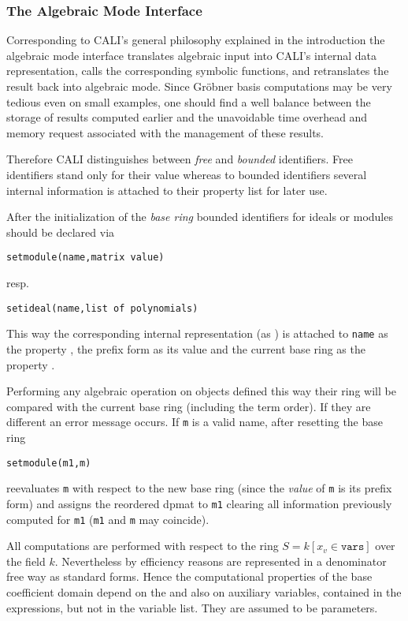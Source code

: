 \subsubsection{The Algebraic Mode Interface}

Corresponding to CALI's general philosophy explained in the
introduction the algebraic mode interface translates algebraic input
into CALI's internal data representation, calls the corresponding
symbolic functions, and retranslates the result back into algebraic
mode. Since Gr\"obner basis computations may be very tedious even on small
examples, one should find a well balance between the storage of
results computed earlier and the unavoidable time overhead and memory
request associated with the management of these results.

Therefore CALI distinguishes between \emph{free} and \emph{bounded}
 identifiers. Free
identifiers stand only for their value whereas to bounded identifiers
several internal information is attached to their property list for
later use.
\medskip

After the initialization of the \emph{base ring} bounded identifiers
for ideals or modules should be declared via
\begin{verbatim}
setmodule(name,matrix value)
\end{verbatim}
resp.
\begin{verbatim}
setideal(name,list of polynomials)
\end{verbatim}
This way the corresponding internal representation (as )
is attached to \texttt{name} as the property , the prefix
form as its value and the current base ring as the property
.

Performing any algebraic operation on objects defined this way their
ring will be compared with the current base ring (including the term
order). If they are different an error message occurs. If \texttt{m} is
a valid name, after resetting the base ring
\begin{verbatim}
setmodule(m1,m)
\end{verbatim}
reevaluates \texttt{m} with respect to the new base ring (since the
\emph{value} of \texttt{m} is its prefix form) and assigns the reordered
dpmat to \texttt{m1} clearing all information previously computed for
\texttt{m1} (\texttt{m1} and \texttt{m} may coincide).

All computations are performed with respect to the ring $S=k[x_v\in
\texttt{vars}]$ over the field $k$. Nevertheless by efficiency reasons
 are represented in a denominator free way as
standard forms. Hence the computational properties of the base
coefficient domain depend on the  and also on auxiliary
variables, contained in the expressions, but not in the variable
list. They are assumed to be parameters.

